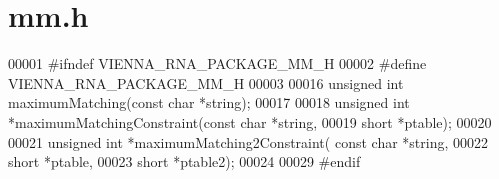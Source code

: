 \hypertarget{mm_8h_source}{\section{mm.\+h}
\label{mm_8h_source}
}

\begin{DoxyCode}
00001 \textcolor{preprocessor}{#ifndef VIENNA\_RNA\_PACKAGE\_MM\_H}
00002 \textcolor{preprocessor}{#define VIENNA\_RNA\_PACKAGE\_MM\_H}
00003 
00016 \textcolor{keywordtype}{unsigned} \textcolor{keywordtype}{int}  maximumMatching(\textcolor{keyword}{const} \textcolor{keywordtype}{char} *\textcolor{keywordtype}{string});
00017 
00018 \textcolor{keywordtype}{unsigned} \textcolor{keywordtype}{int} *maximumMatchingConstraint(\textcolor{keyword}{const} \textcolor{keywordtype}{char} *\textcolor{keywordtype}{string},
00019                                         \textcolor{keywordtype}{short} *ptable);
00020 
00021 \textcolor{keywordtype}{unsigned} \textcolor{keywordtype}{int} *maximumMatching2Constraint( \textcolor{keyword}{const} \textcolor{keywordtype}{char} *\textcolor{keywordtype}{string},
00022                                           \textcolor{keywordtype}{short} *ptable,
00023                                           \textcolor{keywordtype}{short} *ptable2);
00024 
00029 \textcolor{preprocessor}{#endif}
\end{DoxyCode}

